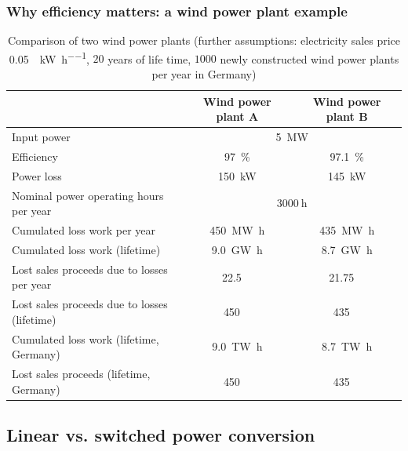 \begin{frame}[c]
	\frametitle{Why efficiency matters: a wind power plant example}
	\begin{table}
		\centering
		\begin{tabular}{lcc}
			\toprule
			& Wind power plant A & Wind power plant B \\
			\midrule
			Input power & \multicolumn{2}{c}{\SI{5}{\mega\watt}} \pause\\
			Efficiency & \SI{97}{\percent} & \SI{97.1}{\percent}  \pause\\
			Power loss & \SI{150}{\kilo\watt} & \SI{145}{\kilo\watt}\pause\\
			\midrule
			Nominal power operating hours per year & \multicolumn{2}{c}{$\SI{3000}{\hour}$} \pause\\
			Cumulated loss work per year & \SI{450}{\mega\watt\hour} & \SI{435}{\mega\watt\hour} \pause\\
			Cumulated loss work (lifetime) & \SI{9.0}{\giga\watt\hour} & \SI{8.7}{\giga\watt\hour} \pause\\
			\midrule
			Lost sales proceeds due to losses per year  & \SI{22.5}{\kilo\EUR} & \SI{21.75}{\kilo\EUR} \pause\\
			Lost sales proceeds due to losses (lifetime)  & \SI{450}{\kilo\EUR} & \SI{435}{\kilo\EUR} \pause\\
			\midrule
			Cumulated loss work (lifetime, Germany)  & \SI{9.0}{\tera\watt\hour} & \SI{8.7}{\tera\watt\hour} \pause\\
			Lost sales proceeds (lifetime, Germany)  & \SI{450}{\mega\EUR} & \SI{435}{\mega\EUR} \\
			\bottomrule
		\end{tabular}
		\label{tab:efficiency_wind_power_example}
		\caption{Comparison of two wind power plants (further assumptions:  electricity sales price \SI[fraction-function=\nicefrac]{0.05}{\EUR\per\kilo\watt\per\hour}, $20$ years of life time, $\num{1000}$ newly constructed wind power plants per year in Germany)}
	\end{table}
\end{frame}

\subsection{Linear vs. switched power conversion}

